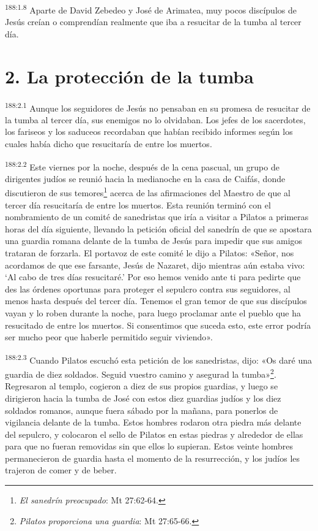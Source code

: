 \par 
\textsuperscript{188:1.8} Aparte de David Zebedeo y José de Arimatea, muy pocos discípulos de Jesús creían o comprendían realmente que iba a resucitar de la tumba al tercer día.

\section*{2. La protección de la tumba}
\par 
\textsuperscript{188:2.1} Aunque los seguidores de Jesús no pensaban en su promesa de resucitar de la tumba al tercer día, sus enemigos no lo olvidaban. Los jefes de los sacerdotes, los fariseos y los saduceos recordaban que habían recibido informes según los cuales había dicho que resucitaría de entre los muertos.

\par 
\textsuperscript{188:2.2} Este viernes por la noche, después de la cena pascual, un grupo de dirigentes judíos se reunió hacia la medianoche en la casa de Caifás, donde discutieron de sus temores\footnote{\textit{El sanedrín preocupado}: Mt 27:62-64.} acerca de las afirmaciones del Maestro de que al tercer día resucitaría de entre los muertos. Esta reunión terminó con el nombramiento de un comité de sanedristas que iría a visitar a Pilatos a primeras horas del día siguiente, llevando la petición oficial del sanedrín de que se apostara una guardia romana delante de la tumba de Jesús para impedir que sus amigos trataran de forzarla. El portavoz de este comité le dijo a Pilatos: «Señor, nos acordamos de que ese farsante, Jesús de Nazaret, dijo mientras aún estaba vivo: `Al cabo de tres días resucitaré.' Por eso hemos venido ante ti para pedirte que des las órdenes oportunas para proteger el sepulcro contra sus seguidores, al menos hasta después del tercer día. Tenemos el gran temor de que sus discípulos vayan y lo roben durante la noche, para luego proclamar ante el pueblo que ha resucitado de entre los muertos. Si consentimos que suceda esto, este error podría ser mucho peor que haberle permitido seguir viviendo».

\par 
\textsuperscript{188:2.3} Cuando Pilatos escuchó esta petición de los sanedristas, dijo: «Os daré una guardia de diez soldados. Seguid vuestro camino y asegurad la tumba»\footnote{\textit{Pilatos proporciona una guardia}: Mt 27:65-66.}. Regresaron al templo, cogieron a diez de sus propios guardias, y luego se dirigieron hacia la tumba de José con estos diez guardias judíos y los diez soldados romanos, aunque fuera sábado por la mañana, para ponerlos de vigilancia delante de la tumba. Estos hombres rodaron otra piedra más delante del sepulcro, y colocaron el sello de Pilatos en estas piedras y alrededor de ellas para que no fueran removidas sin que ellos lo supieran. Estos veinte hombres permanecieron de guardia hasta el momento de la resurrección, y los judíos les trajeron de comer y de beber.

